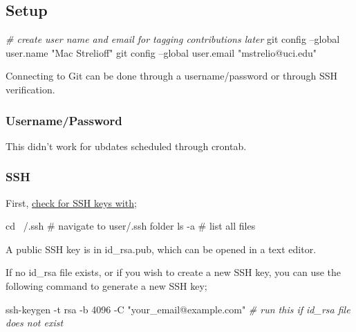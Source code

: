 \documentclass[]{article}
\newenvironment{Shaded}{\begin{snugshade}}{\end{snugshade}}
\newcommand{\StringTok}[1]{\textcolor[rgb]{0.31,0.60,0.02}{#1}}
\newcommand{\CommentTok}[1]{\textcolor[rgb]{0.56,0.35,0.01}{\textit{#1}}}
\newcommand{\FunctionTok}[1]{\textcolor[rgb]{0.00,0.00,0.00}{#1}}
\newcommand{\BuiltInTok}[1]{#1}
\newcommand{\NormalTok}[1]{#1}
\begin{document}
\subsection{Setup}

\begin{Shaded}
\begin{Highlighting}[]
\CommentTok{# create user name and email for tagging contributions later}
\FunctionTok{git}\NormalTok{ config --global user.name }\StringTok{"Mac Strelioff"}   
\FunctionTok{git}\NormalTok{ config --global user.email }\StringTok{"mstrelio@uci.edu"} 
\end{Highlighting}
\end{Shaded}

Connecting to Git can be done through a username/password or through SSH
verification.

\subsubsection{Username/Password}

This didn't work for ubdates scheduled through crontab.

\subsubsection{SSH}

First,
\href{https://help.github.com/articles/checking-for-existing-ssh-keys/}{\color{blue}check for SSH keys with};

\begin{Shaded}
\begin{Highlighting}[]
\BuiltInTok{cd}\NormalTok{ ~/.ssh  # navigate to user/.ssh folder}
\FunctionTok{ls}\NormalTok{ -a      # list all files}
\end{Highlighting}
\end{Shaded}

A public SSH key is in id\_rsa.pub, which can be opened in a text
editor.

If no id\_rsa file exists, or if you wish to create a new SSH key, you
can use the following command to generate a new SSH key;

\begin{Shaded}
\begin{Highlighting}[]
\FunctionTok{ssh-keygen}\NormalTok{ -t rsa -b 4096 -C }\StringTok{"your_email@example.com"} \CommentTok{# run this if id_rsa file does not exist}
\end{Highlighting}
\end{Shaded}
\end{document}
